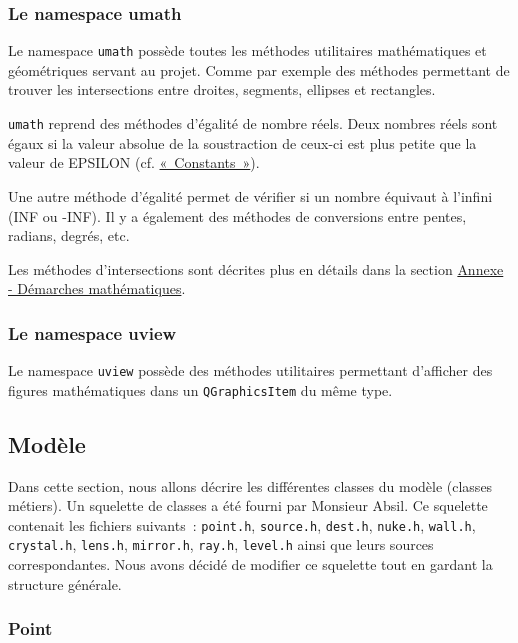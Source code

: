 \documentclass[]{report}
\begin{document}
\subsubsection{Le namespace umath}

Le namespace \texttt{umath} possède toutes les méthodes utilitaires mathématiques
et géométriques servant au projet. Comme par exemple des méthodes permettant de trouver
les intersections entre droites, segments, ellipses et rectangles.

\label{equals}
\texttt{umath} reprend des méthodes d'égalité de nombre réels. Deux nombres réels sont égaux
si la valeur absolue de la soustraction de ceux-ci est plus petite que la valeur de EPSILON (cf. \hyperref[Constants]{«~Constants~»}).


Une autre méthode d’égalité permet de vérifier si un nombre équivaut à l’infini (INF ou -INF).
Il y a également des méthodes de conversions entre pentes, radians, degrés, etc.

Les méthodes d’intersections sont décrites plus en détails dans la section \hyperref[Annexe]{Annexe - Démarches mathématiques}.

\subsubsection{Le namespace uview}

Le namespace \texttt{uview} possède des méthodes utilitaires permettant d'afficher des 
figures mathématiques dans un \texttt{QGraphicsItem} du même type.

\newpage
\subsection{Modèle}

Dans cette section, nous allons décrire les différentes classes du modèle 
(classes métiers).
Un squelette de classes a été fourni par Monsieur Absil.
Ce squelette contenait les fichiers suivants~:
\texttt{point.h}, \texttt{source.h}, \texttt{dest.h}, \texttt{nuke.h}, \texttt{wall.h},
\texttt{crystal.h}, \texttt{lens.h}, \texttt{mirror.h}, \texttt{ray.h}, \texttt{level.h} ainsi que leurs sources correspondantes.
Nous avons décidé de modifier ce squelette tout en gardant la 
structure générale.

\subsubsection{\label{Point}Point}
\end{document}
